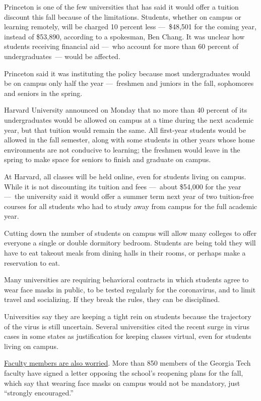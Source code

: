 Princeton is one of the few universities that has said it would offer a
tuition discount this fall because of the limitations. Students, whether
on campus or learning remotely, will be charged 10 percent less
---~\$48,501 for the coming year, instead of \$53,890, according to a
spokesman, Ben Chang. It was unclear how students receiving financial
aid ---~who account for more than 60 percent of undergraduates~--- would
be affected.

Princeton said it was instituting the policy because most undergraduates
would be on campus only half the year ---~freshmen and juniors in the
fall, sophomores and seniors in the spring.

Harvard University announced on Monday that no more than 40 percent of
its undergraduates would be allowed on campus at a time during the next
academic year, but that tuition would remain the same. All first-year
students would be allowed in the fall semester, along with some students
in other years whose home environments are not conducive to learning;
the freshmen would leave in the spring to make space for seniors to
finish and graduate on campus.

At Harvard, all classes will be held online, even for students living on
campus. While it is not discounting its tuition and fees ---~about
\$54,000 for the year ---~the university said it would offer a summer
term next year of two tuition-free courses for all students who had to
study away from campus for the full academic year.

Cutting down the number of students on campus will allow many colleges
to offer everyone a single or double dormitory bedroom. Students are
being told they will have to eat takeout meals from dining halls in
their rooms, or perhaps make a reservation to eat.

Many universities are requiring behavioral contracts in which students
agree to wear face masks in public, to be tested regularly for the
coronavirus, and to limit travel and socializing. If they break the
rules, they can be disciplined.

Universities say they are keeping a tight rein on students because the
trajectory of the virus is still uncertain. Several universities cited
the recent surge in virus cases in some states as justification for
keeping classes virtual, even for students living on campus.

\href{https://www.nytimes.com/2020/07/03/us/coronavirus-college-professors.html}{Faculty
members are also worried}. More than 850 members of the Georgia Tech
faculty have signed a letter opposing the school's reopening plans for
the fall, which say that wearing face masks on campus would not be
mandatory, just ``strongly encouraged.''

